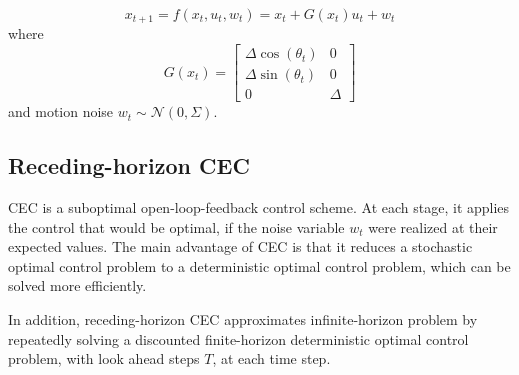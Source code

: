 \documentclass[conference]{IEEEtran}
\begin{document}
\[
{x}_{t+1} = {f}({x}_t, {u}_t, {w}_t) = {x}_t + {G}({x}_t) {u}_t + {w}_t
\]
where
\[
{G}({x}_t) = \begin{bmatrix}
\Delta \cos(\theta_t) & 0 \\
\Delta \sin(\theta_t) & 0 \\
0 & \Delta 
\end{bmatrix}
\]
and motion noise \( {w}_t \sim \mathcal{N}(0, \Sigma) \).

\subsection{Receding-horizon CEC}
CEC is a suboptimal open-loop-feedback control scheme.
At each stage, it applies the control that would be optimal,
if the noise variable $w_t$ were realized at their expected values. 
The main advantage of CEC is that it reduces 
a stochastic optimal control problem to a deterministic optimal control problem, 
which can be solved more efficiently. 

In addition,
receding-horizon CEC approximates infinite-horizon problem 
by repeatedly solving a discounted finite-horizon
deterministic optimal control problem, with look ahead steps $T$, at each time step.
\end{document}
